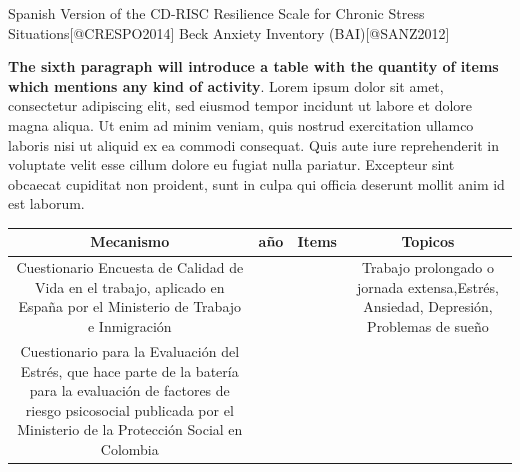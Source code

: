 \documentclass[]{article}
\begin{document}
Spanish Version of the CD-RISC Resilience Scale for Chronic Stress
Situations{[}@CRESPO2014{]} Beck Anxiety Inventory (BAI){[}@SANZ2012{]}

\textbf{The sixth paragraph will introduce a table with the quantity of
items which mentions any kind of activity}. Lorem ipsum dolor sit amet,
consectetur adipiscing elit, sed eiusmod tempor incidunt ut labore et
dolore magna aliqua. Ut enim ad minim veniam, quis nostrud exercitation
ullamco laboris nisi ut aliquid ex ea commodi consequat. Quis aute iure
reprehenderit in voluptate velit esse cillum dolore eu fugiat nulla
pariatur. Excepteur sint obcaecat cupiditat non proident, sunt in culpa
qui officia deserunt mollit anim id est laborum.

\begin{longtable}[]{@{}cccc@{}}
\toprule
\begin{minipage}[b]{0.52\columnwidth}\centering
Mecanismo\strut
\end{minipage} & \begin{minipage}[b]{0.02\columnwidth}\centering
año\strut
\end{minipage} & \begin{minipage}[b]{0.05\columnwidth}\centering
Items\strut
\end{minipage} & \begin{minipage}[b]{0.30\columnwidth}\centering
Topicos\strut
\end{minipage}\tabularnewline
\midrule
\endhead
\begin{minipage}[t]{0.52\columnwidth}\centering
Cuestionario Encuesta de Calidad de Vida en el trabajo, aplicado en
España por el Ministerio de Trabajo e Inmigración\strut
\end{minipage} & \begin{minipage}[t]{0.02\columnwidth}\centering
2018\strut
\end{minipage} & \begin{minipage}[t]{0.05\columnwidth}\centering
3\strut
\end{minipage} & \begin{minipage}[t]{0.30\columnwidth}\centering
Trabajo prolongado o jornada extensa,Estrés, Ansiedad, Depresión,
Problemas de sueño\strut
\end{minipage}\tabularnewline
\begin{minipage}[t]{0.52\columnwidth}\centering
Cuestionario para la Evaluación del Estrés, que hace parte de la batería
para la evaluación de factores de riesgo psicosocial publicada por el
Ministerio de la Protección Social en Colombia\strut

\end{minipage}
\end{longtable}
\end{document}

